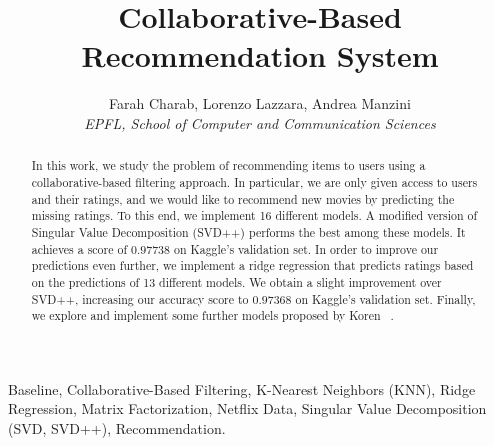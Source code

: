 \documentclass[10pt,conference,compsocconf]{IEEEtran}
\begin{document}
\title{Collaborative-Based Recommendation System}

\author{
  Farah Charab, Lorenzo Lazzara, Andrea Manzini\\
  \textit{EPFL, School of Computer and Communication Sciences}
}

\maketitle

\begin{abstract}
	In this work, we study the problem of recommending items to users using a collaborative-based filtering approach. In particular, we are only given access to users and their ratings, and we would like to recommend new movies by predicting the missing ratings. To this end, we implement 16 different models. A modified version of Singular Value Decomposition (SVD++) performs the best among these models. It achieves a score of $0.97738$ on Kaggle's validation set. In order to improve our predictions even further, we implement a ridge regression that predicts ratings based on the predictions of 13 different models. We obtain a slight improvement over SVD++, increasing our accuracy score to $0.97368$ on Kaggle's validation set. Finally, we explore and implement some further models proposed by Koren ~\cite{koren2010factor}.
\end{abstract}
\begin{IEEEkeywords}
Baseline, Collaborative-Based Filtering, K-Nearest Neighbors (KNN), Ridge Regression, Matrix Factorization, Netflix Data, Singular Value Decomposition (SVD, SVD++), Recommendation.
\end{IEEEkeywords}
\end{document}

